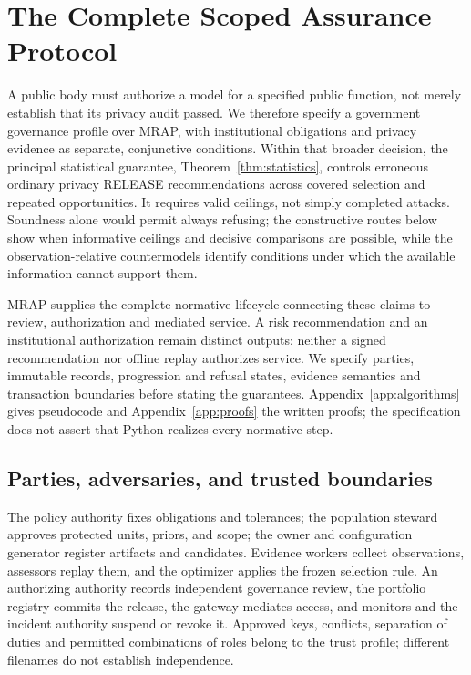 \section{The Complete Scoped Assurance Protocol}
\label{sec:theory-protocol}
A public body must authorize a model for a specified public function, not
merely establish that its privacy audit passed. We therefore specify a
government governance profile over MRAP, with institutional obligations and
privacy evidence as separate, conjunctive conditions. Within that broader
decision, the principal statistical guarantee,
Theorem~\ref{thm:statistics}, controls erroneous ordinary privacy RELEASE
recommendations across covered selection and repeated opportunities.
It requires valid ceilings, not simply completed attacks. Soundness alone
would permit always refusing; the constructive routes below show when
informative ceilings and decisive comparisons are possible, while the
observation-relative countermodels identify conditions under which the
available information cannot support them.

MRAP supplies the complete normative lifecycle connecting these claims to
review, authorization and mediated service. A risk recommendation and an
institutional authorization remain distinct outputs: neither a signed
recommendation nor offline replay authorizes service.
We specify parties, immutable records, progression and refusal states,
evidence semantics and transaction boundaries before stating the guarantees.
Appendix~\ref{app:algorithms} gives pseudocode and
Appendix~\ref{app:proofs} the written proofs; the specification does not assert
that Python realizes every normative step.

\subsection{Parties, adversaries, and trusted boundaries}
The policy authority fixes obligations and tolerances; the population steward
approves protected units, priors, and scope; the owner and configuration
generator register artifacts and candidates. Evidence workers collect
observations, assessors replay them, and the optimizer applies the frozen
selection rule. An authorizing authority records independent governance
review, the portfolio registry commits the release, the gateway mediates
access, and monitors and the incident authority suspend or revoke it. Approved
keys, conflicts, separation of duties and permitted combinations of roles
belong to the trust profile; different filenames do not establish independence.

